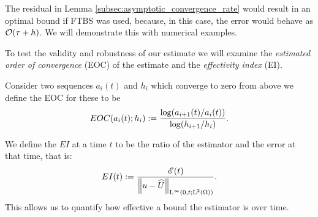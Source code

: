 \documentclass[final]{amsart}
\numberwithin{equation}{section}
\begin{document}
\begin{Rem}
The residual in Lemma \ref{subsec:asymptotic_convergence_rate} would result in an optimal bound if FTBS was used, because, in this case, the error  would behave as $\mathcal{O}\!\left({\tau+h}\right)$.  We will demonstrate this with numerical examples.
\end{Rem}
\begin{Defn}
  To test the validity and robustness of our estimate we will
  examine the \emph{estimated order of convergence} (EOC) of the
  estimate and the \emph{effectivity index} (EI).
	
  Consider two sequences $a_i(t)$ and $h_i$ which converge to zero
  from above we define the EOC for these to be
  \begin{equation}\label{eq_EOC}
    EOC\!\left({a_i(t);h_i}\right):=\frac{\log\!\left({a_{i+1}(t)/a_{i}(t)}\right)}{\log\!\left({h_{i+1}/h_{i}}\right)}.
  \end{equation}
	
  We define the $EI$ at a time $t$ to be the ratio of the estimator
  and the error at that time, that is:
  \begin{equation}
    EI\!\left({t}\right):=\frac{\mathscr E(t)}{\left\|u - \widehat U\right\|_{\operatorname L^{\infty}(0,t;\operatorname L^{2}(\Omega))}}.
  \end{equation}
  This allows us to quantify how effective a bound the estimator is
  over time.
\end{Defn}
\end{document}
